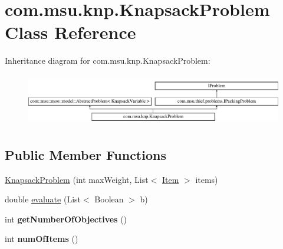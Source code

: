 \hypertarget{classcom_1_1msu_1_1knp_1_1KnapsackProblem}{\section{com.\-msu.\-knp.\-Knapsack\-Problem Class Reference}
\label{classcom_1_1msu_1_1knp_1_1KnapsackProblem}
}
Inheritance diagram for com.\-msu.\-knp.\-Knapsack\-Problem\-:\begin{figure}[H]
\begin{center}
\leavevmode
\includegraphics[height=2.301370cm]{classcom_1_1msu_1_1knp_1_1KnapsackProblem}
\end{center}
\end{figure}
\subsection*{Public Member Functions}
\begin{DoxyCompactItemize}
\item 
\hyperlink{classcom_1_1msu_1_1knp_1_1KnapsackProblem_a8cc3eead021b3b28d87be891563fcda3}{Knapsack\-Problem} (int max\-Weight, List$<$ \hyperlink{classcom_1_1msu_1_1thief_1_1model_1_1Item}{Item} $>$ items)
\item 
double \hyperlink{classcom_1_1msu_1_1knp_1_1KnapsackProblem_a688e4bdef229b11397db6c65421228cb}{evaluate} (List$<$ Boolean $>$ b)
\item 
\hypertarget{classcom_1_1msu_1_1knp_1_1KnapsackProblem_a16aa516d8fadcd091124badf0f837526}{int {\bfseries get\-Number\-Of\-Objectives} ()}\label{classcom_1_1msu_1_1knp_1_1KnapsackProblem_a16aa516d8fadcd091124badf0f837526}

\item 
\hypertarget{classcom_1_1msu_1_1knp_1_1KnapsackProblem_afe0445cd0c20ac2c95937d4253770228}{int {\bfseries num\-Of\-Items} ()}\label{classcom_1_1msu_1_1knp_1_1KnapsackProblem_afe0445cd0c20ac2c95937d4253770228}

\end{DoxyCompactItemize}
